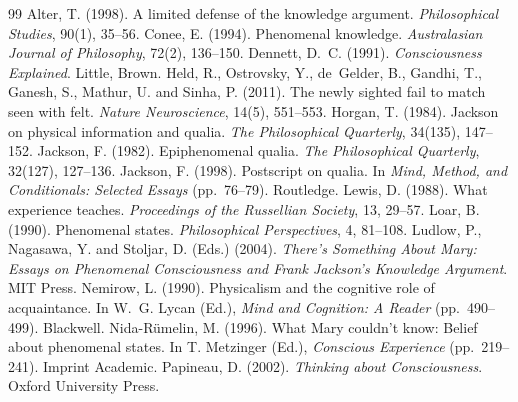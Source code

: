 \documentclass{situationist-preprint}
\begin{document}
\begin{thebibliography}{99}\small
{} Alter, T. (1998). A limited defense of the knowledge argument. \emph{Philosophical Studies}, 90(1), 35--56.
 Conee, E. (1994). Phenomenal knowledge. \emph{Australasian Journal of Philosophy}, 72(2), 136--150.
 Dennett, D.~C. (1991). \emph{Consciousness Explained}. Little, Brown.
 Held, R., Ostrovsky, Y., de~Gelder, B., Gandhi, T., Ganesh, S., Mathur, U. and Sinha, P. (2011). The newly sighted fail to match seen with felt. \emph{Nature Neuroscience}, 14(5), 551--553.
 Horgan, T. (1984). Jackson on physical information and qualia. \emph{The Philosophical Quarterly}, 34(135), 147--152.
 Jackson, F. (1982). Epiphenomenal qualia. \emph{The Philosophical Quarterly}, 32(127), 127--136.
 Jackson, F. (1998). Postscript on qualia. In \emph{Mind, Method, and Conditionals: Selected Essays} (pp.~76--79). Routledge.
 Lewis, D. (1988). What experience teaches. \emph{Proceedings of the Russellian Society}, 13, 29--57.
 Loar, B. (1990). Phenomenal states. \emph{Philosophical Perspectives}, 4, 81--108.
 Ludlow, P., Nagasawa, Y. and Stoljar, D. (Eds.) (2004). \emph{There's Something About Mary: Essays on Phenomenal Consciousness and Frank Jackson's Knowledge Argument}. MIT Press.
 Nemirow, L. (1990). Physicalism and the cognitive role of acquaintance. In W.~G. Lycan (Ed.), \emph{Mind and Cognition: A Reader} (pp.~490--499). Blackwell.
 Nida-Rümelin, M. (1996). What Mary couldn't know: Belief about phenomenal states. In T. Metzinger (Ed.), \emph{Conscious Experience} (pp.~219--241). Imprint Academic.
 Papineau, D. (2002). \emph{Thinking about Consciousness}. Oxford University Press.
\end{thebibliography}
\end{document}
